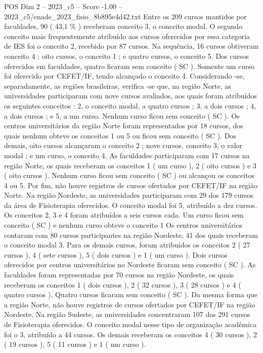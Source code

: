 \begin{textsample}{POS Dim 2 – 2023\_c5 – Score -1.00 – 2023\_c5/enade\_2023\_fisio\_8b895e4d42.txt}
Entre os 209 cursos mantidos por faculdades, 90 ( 43,1 \% ) receberam conceito 3, o conceito modal.
O segundo conceito mais frequentemente atribuído aos cursos oferecidos por essa categoria de IES foi o conceito 2, recebido por 87 cursos.
Na sequência, 16 cursos obtiveram conceito 4 ; oito cursos, o conceito 1 ; e quatro cursos, o conceito 5.
Dos cursos oferecidos em faculdades, quatro ficaram sem conceito ( SC ).
Somente um curso foi oferecido por CEFET/IF, tendo alcançado o conceito 4.
Considerando -se, separadamente, as regiões brasileiras, verifica -se que, na região Norte, as universidades participaram com nove cursos avaliados, aos quais foram atribuídos os seguintes conceitos : 2, o conceito modal, a quatro cursos ; 3, a dois cursos ; 4, a dois cursos ; e 5, a um curso.
Nenhum curso ficou sem conceito ( SC ).
Os centros universitários da região Norte foram representados por 18 cursos, dos quais nenhum obteve os conceitos 1 ou 5 ou ficou sem conceito ( SC ).
Dos demais, oito cursos alcançaram o conceito 2 ; nove cursos, conceito 3, o valor modal ; e um curso, o conceito 4.
As faculdades participaram com 17 cursos na região Norte, os quais receberam os conceitos 1 ( um curso ), 2 ( oito cursos ) e 3 ( oito cursos ).
Nenhum curso ficou sem conceito ( SC ) ou alcançou os conceitos 4 ou 5.
Por fim, não houve registros de cursos ofertados por CEFET/IF na região Norte.
Na região Nordeste, as universidades participaram com 29 dos 179 cursos da área de Fisioterapia oferecidos.
O conceito modal foi 5, atribuído a dez cursos.
Os conceitos 2, 3 e 4 foram atribuídos a seis cursos cada.
Um curso ficou sem conceito ( SC ) e nenhum curso obteve o conceito 1 Os centros universitários contaram com 80 cursos participantes na região Nordeste, 41 dos quais receberam o conceito modal 3.
Para os demais cursos, foram atribuídos os conceitos 2 ( 27 cursos ), 4 ( sete cursos ), 5 ( dois cursos ) e 1 ( um curso ).
Dois cursos oferecidos por centros universitários no Nordeste ficaram sem conceito ( SC ).
As faculdades foram representadas por 70 cursos na região Nordeste, os quais receberam os conceitos 1 ( dois cursos ), 2 ( 32 cursos ), 3 ( 28 cursos ) e 4 ( quatro cursos ).
Quatro cursos ficaram sem conceito ( SC ).
Da mesma forma que a região Norte, não houve registros de cursos ofertados por CEFET/IF na região Nordeste.
Na região Sudeste, as universidades concentraram 107 dos 291 cursos de Fisioterapia oferecidos.
O conceito modal nesse tipo de organização acadêmica foi o 3, atribuído a 44 cursos.
Os demais receberam os conceitos 4 ( 30 cursos ), 2 ( 19 cursos ), 5 ( 11 cursos ) e 1 ( um curso ).

\end{textsample}
